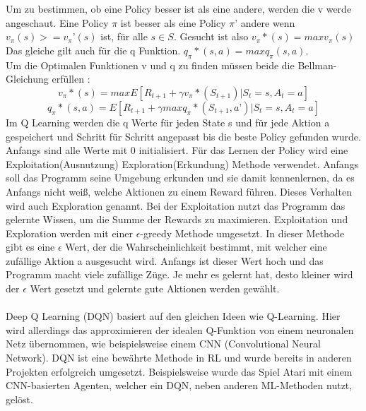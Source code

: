 \\\\
Um zu bestimmen, ob eine Policy besser ist als eine andere, werden die v werde angeschaut. Eine Policy $\pi$ ist besser als eine Policy $\pi’$ andere wenn $v_\pi(s) >= v_\pi’(s)$ ist, für alle $s \in S$. 
Gesucht ist also $v_\pi*(s) =max v_\pi(s)$
Das gleiche gilt auch für die q Funktion.
$q_\pi*(s,a) = max q_\pi(s,a)$.
\\
Um die Optimalen Funktionen v und q zu finden müssen beide die Bellman-Gleichung erfüllen :
\begin{equation}
v_\pi*(s) = max E[R_{t+1}+ \gamma{}v_\pi*(S_{t+1})|S_t= s, A_t=a]
\end{equation}
\begin{equation}
q_\pi*(s,a) = E[R_{t+1} + \gamma{}maxq_\pi*(S_{t+1},a’)|S_t= s, A_t=a] 
\end{equation}
Im Q Learning werden die q Werte für jeden State s und für jede Aktion a gespeichert und Schritt für Schritt angepasst bis die beste Policy gefunden wurde. Anfangs sind alle Werte mit 0 initialisiert.
Für das Lernen der Policy wird eine Exploitation(Ausnutzung) Exploration(Erkundung) Methode verwendet. Anfangs soll das Programm seine Umgebung erkunden und sie damit kennenlernen, da es Anfangs nicht weiß, welche Aktionen zu einem Reward führen. Dieses Verhalten wird auch Exploration genannt. Bei der Exploitation nutzt das Programm das gelernte Wissen, um die Summe der Rewards zu maximieren. 
Exploitation und Exploration werden mit einer $\epsilon$-greedy Methode umgesetzt.
In dieser Methode gibt es eine $\epsilon$ Wert, der die Wahrscheinlichkeit bestimmt, mit welcher eine zufällige Aktion a ausgesucht wird. Anfangs ist dieser Wert hoch und das Programm macht viele zufällige Züge. Je mehr es gelernt hat, desto kleiner wird der $\epsilon$ Wert gesetzt und gelernte gute Aktionen werden gewählt.
\\\\
Deep Q Learning (DQN)  basiert auf den gleichen Ideen wie Q-Learning. Hier wird allerdings das approximieren der idealen Q-Funktion von einem neuronalen Netz übernommen, wie beispielsweise einem CNN (Convolutional Neural Network).
DQN ist eine bewährte Methode in RL und wurde bereits in anderen Projekten erfolgreich umgesetzt. Beispielsweise wurde das Spiel Atari mit einem CNN-basierten Agenten, welcher ein DQN, neben anderen ML-Methoden nutzt, gelöst.  


